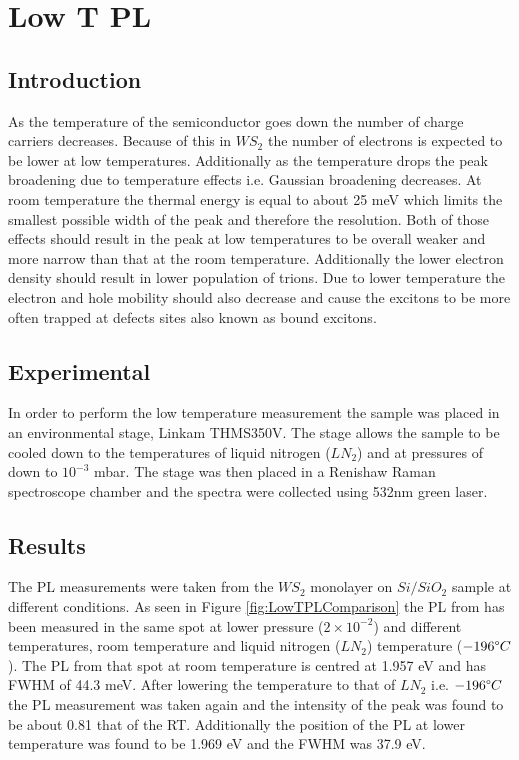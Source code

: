 \chapter{Low T PL}

\section{Introduction}

As the temperature of the semiconductor goes down the number of charge carriers decreases. Because of this in $WS_2$ the number of electrons is expected to be lower at low temperatures. Additionally as the temperature drops the peak broadening due to temperature effects i.e. Gaussian broadening decreases. At room temperature the thermal energy is equal to about 25 meV which limits the smallest possible width of the peak and therefore the resolution. Both of those effects should result in the peak at low temperatures to be overall weaker and more narrow than that at the room temperature. Additionally the lower electron density should result in lower population of trions. Due to lower temperature the electron and hole mobility should also decrease and cause the excitons to be more often trapped at defects sites also known as bound excitons.

\section{Experimental}

In order to perform the low temperature measurement the sample was placed in an environmental stage, Linkam THMS350V. The stage allows the sample to be cooled down to the temperatures of liquid nitrogen ($LN_2$) and at pressures of down to $10^{-3}$ mbar. The stage was then placed in a Renishaw Raman spectroscope chamber and the spectra were collected using 532nm green laser.

\section{Results}

The PL measurements were taken from the $WS_2$ monolayer on $Si/SiO_2$ sample at different conditions. As seen in Figure \ref{fig:LowTPLComparison} the PL from has been measured in the same spot at lower pressure ($2 \times 10^{-2}$) and different temperatures, room temperature and liquid nitrogen ($LN_2$) temperature ($-196 \degree C$). The PL from that spot at room temperature is centred at 1.957 eV and has FWHM of 44.3 meV. After lowering the temperature to that of $LN_2$ i.e. $-196 \degree C$ the PL measurement was taken again and the intensity of the peak was found to be about 0.81 that of the RT. Additionally the position of the PL at lower temperature was found to be 1.969 eV and the FWHM was 37.9 eV.

